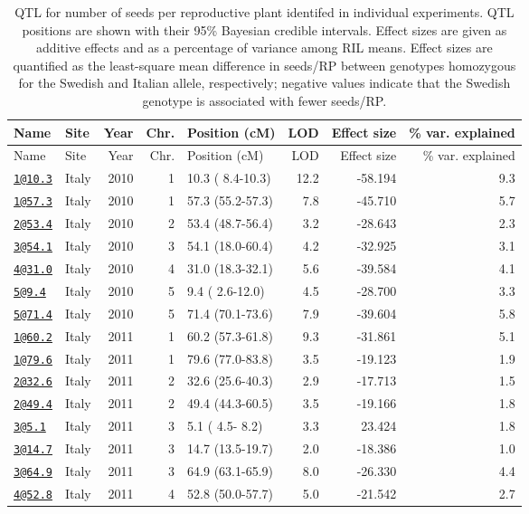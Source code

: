 \documentclass[]{article}
\begin{document}
\begin{longtable}[]{@{}llrrlrrr@{}}
\caption{\label{tab:individual-tofu-qtl}QTL for number of seeds per reproductive plant identifed in individual experiments. QTL positions are shown with their 95\% Bayesian credible intervals. Effect sizes are given as additive effects and as a percentage of variance among RIL means. Effect sizes are quantified as the least-square mean difference in seeds/RP between genotypes homozygous for the Swedish and Italian allele, respectively; negative values indicate that the Swedish genotype is associated with fewer seeds/RP.}\tabularnewline
\toprule
Name & Site & Year & Chr. & Position (cM) & LOD & Effect size & \% var. explained\tabularnewline
\midrule
\endfirsthead
\toprule
Name & Site & Year & Chr. & Position (cM) & LOD & Effect size & \% var. explained\tabularnewline
\midrule
\endhead
\href{mailto:1@10.3}{\nolinkurl{1@10.3}} & Italy & 2010 & 1 & 10.3 ( 8.4-10.3) & 12.2 & -58.194 & 9.3\tabularnewline
\href{mailto:1@57.3}{\nolinkurl{1@57.3}} & Italy & 2010 & 1 & 57.3 (55.2-57.3) & 7.8 & -45.710 & 5.7\tabularnewline
\href{mailto:2@53.4}{\nolinkurl{2@53.4}} & Italy & 2010 & 2 & 53.4 (48.7-56.4) & 3.2 & -28.643 & 2.3\tabularnewline
\href{mailto:3@54.1}{\nolinkurl{3@54.1}} & Italy & 2010 & 3 & 54.1 (18.0-60.4) & 4.2 & -32.925 & 3.1\tabularnewline
\href{mailto:4@31.0}{\nolinkurl{4@31.0}} & Italy & 2010 & 4 & 31.0 (18.3-32.1) & 5.6 & -39.584 & 4.1\tabularnewline
\href{mailto:5@9.4}{\nolinkurl{5@9.4}} & Italy & 2010 & 5 & 9.4 ( 2.6-12.0) & 4.5 & -28.700 & 3.3\tabularnewline
\href{mailto:5@71.4}{\nolinkurl{5@71.4}} & Italy & 2010 & 5 & 71.4 (70.1-73.6) & 7.9 & -39.604 & 5.8\tabularnewline
\href{mailto:1@60.2}{\nolinkurl{1@60.2}} & Italy & 2011 & 1 & 60.2 (57.3-61.8) & 9.3 & -31.861 & 5.1\tabularnewline
\href{mailto:1@79.6}{\nolinkurl{1@79.6}} & Italy & 2011 & 1 & 79.6 (77.0-83.8) & 3.5 & -19.123 & 1.9\tabularnewline
\href{mailto:2@32.6}{\nolinkurl{2@32.6}} & Italy & 2011 & 2 & 32.6 (25.6-40.3) & 2.9 & -17.713 & 1.5\tabularnewline
\href{mailto:2@49.4}{\nolinkurl{2@49.4}} & Italy & 2011 & 2 & 49.4 (44.3-60.5) & 3.5 & -19.166 & 1.8\tabularnewline
\href{mailto:3@5.1}{\nolinkurl{3@5.1}} & Italy & 2011 & 3 & 5.1 ( 4.5- 8.2) & 3.3 & 23.424 & 1.8\tabularnewline
\href{mailto:3@14.7}{\nolinkurl{3@14.7}} & Italy & 2011 & 3 & 14.7 (13.5-19.7) & 2.0 & -18.386 & 1.0\tabularnewline
\href{mailto:3@64.9}{\nolinkurl{3@64.9}} & Italy & 2011 & 3 & 64.9 (63.1-65.9) & 8.0 & -26.330 & 4.4\tabularnewline
\href{mailto:4@52.8}{\nolinkurl{4@52.8}} & Italy & 2011 & 4 & 52.8 (50.0-57.7) & 5.0 & -21.542 & 2.7\tabularnewline

\end{longtable}
\end{document}
